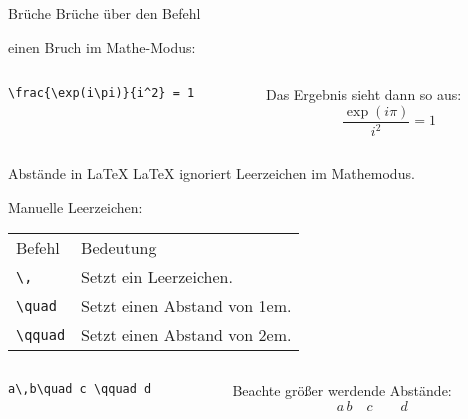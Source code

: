 \begin{frame}[fragile]{Brüche}
Brüche über den Befehl 
\begin{center}
\end{center}
einen Bruch im Mathe-Modus:
\begin{columns}
\begin{column}{0.55\textwidth}
\begin{codeblock}
\begin{verbatim}
\frac{\exp(i\pi)}{i^2} = 1
\end{verbatim}
\end{codeblock}
\end{column}
\begin{column}{0.35\textwidth}
Das Ergebnis sieht dann so aus:
\[
    \frac{\exp(i\pi)}{i^2} = 1
\]
\end{column}
\end{columns}
\end{frame}


\begin{frame}[fragile]{Abstände in \LaTeX}
\LaTeX{} ignoriert Leerzeichen im Mathemodus.

\medskip\pause 
Manuelle Leerzeichen:
\begin{center}
\begin{tabular}{p{}p{}}
Befehl & Bedeutung\\
\verb+\,+ & Setzt ein Leerzeichen. \\
\verb+\quad+ & Setzt einen Abstand von 1em. \\
\verb+\qquad+ & Setzt einen Abstand von 2em.
\end{tabular}
\end{center}\pause
\begin{columns}
\begin{column}{0.4\textwidth}
\begin{codeblock}
\begin{verbatim}
a\,b\quad c \qquad d
\end{verbatim}
\end{codeblock}
\end{column}
\begin{column}{0.35\textwidth}
Beachte größer werdende Abstände: 
\[
a\,b\quad c \qquad d
\]
\end{column}
\end{columns}
\end{frame}



